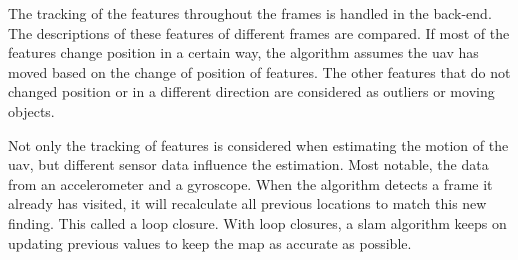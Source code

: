 The tracking of the features throughout the frames is handled in the back\hyp{}end. The descriptions of these features of different frames are compared. If most of the features change position in a certain way, the algorithm assumes the \acs{uav} has moved based on the change of position of features. The other features that do not changed position or in a different direction are considered as outliers or moving objects.

Not only the tracking of features is considered when estimating the motion of the \acs{uav}, but different sensor data influence the estimation. Most notable, the data from an accelerometer and a gyroscope. When the algorithm detects a frame it already has visited, it will recalculate all previous locations to match this new finding. This called a loop closure. With loop closures, a \acs{slam} algorithm keeps on updating previous values to keep the map as accurate as possible.